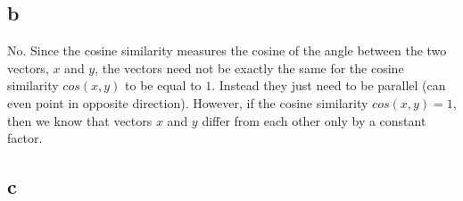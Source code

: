 \documentclass{article}
\begin{document}
\subsection{b}
No. Since the cosine similarity measures the cosine of the angle between the two vectors, $x$ and $y$, the vectors need not be exactly the same for the cosine similarity $cos(x,y)$ to be equal to $1$. Instead they just need to be parallel (can even point in opposite direction). However, if the cosine similarity $cos(x,y) = 1$, then we know that vectors $x$ and $y$ differ from each other only by a constant factor.

\subsection{c}
\end{document}
